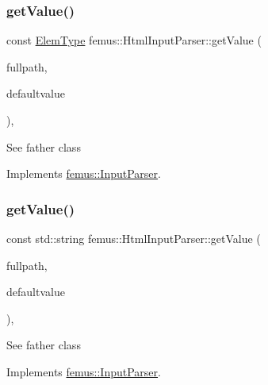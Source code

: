 \subsubsection{\texorpdfstring{get\+Value()}{getValue()}\hspace{0.1cm}{\footnotesize\ttfamily [3/6]}}
{\footnotesize\ttfamily const \mbox{\hyperlink{_elem_type_enum_8hpp_a1b014294b9757a001707c979e2bab627}{Elem\+Type}} femus\+::\+Html\+Input\+Parser\+::get\+Value (\begin{DoxyParamCaption}\item[{const std\+::string \&}]{fullpath,  }\item[{const \mbox{\hyperlink{_elem_type_enum_8hpp_a1b014294b9757a001707c979e2bab627}{Elem\+Type}}}]{defaultvalue }\end{DoxyParamCaption})\hspace{0.3cm}{\ttfamily [inline]}, {\ttfamily [virtual]}}

See father class 

Implements \mbox{\hyperlink{classfemus_1_1_input_parser_a8feee424de84c28d6689361e22769ed1}{femus\+::\+Input\+Parser}}.

\mbox{\label{classfemus_1_1_html_input_parser_ac2df186f98b11d4ccbb0ec2ff4915c86}} 
\subsubsection{\texorpdfstring{get\+Value()}{getValue()}\hspace{0.1cm}{\footnotesize\ttfamily [4/6]}}
{\footnotesize\ttfamily const std\+::string femus\+::\+Html\+Input\+Parser\+::get\+Value (\begin{DoxyParamCaption}\item[{const std\+::string \&}]{fullpath,  }\item[{const std\+::string}]{defaultvalue }\end{DoxyParamCaption})\hspace{0.3cm}{\ttfamily [inline]}, {\ttfamily [virtual]}}

See father class 

Implements \mbox{\hyperlink{classfemus_1_1_input_parser_afc1cace4dae0ea2878d1ddd586dc6a2e}{femus\+::\+Input\+Parser}}.

\mbox{\label{classfemus_1_1_html_input_parser_acbb5375b2cf0e05e663da942ce78496e}} 
